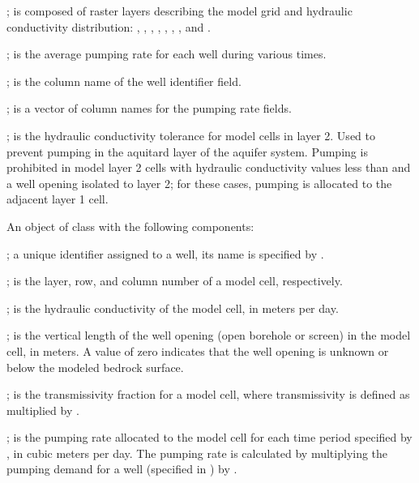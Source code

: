 \documentclass[letterpaper]{book}
\begin{document}
%
\begin{Arguments}
\begin{ldescription}
\item[\code{rs.model}] ; is composed of raster layers describing the model grid and hydraulic conductivity distribution:
, , , , , , , and .
\item[\code{wells}] ; is the average pumping rate for each well during various times.
\item[\code{well.col}] ; is the column name of the well identifier field.
\item[\code{rate.col}] ; is a vector of column names for the pumping rate fields.
\item[\code{lay2.hk.tol}] ; is the hydraulic conductivity tolerance for model cells in layer 2.
Used to prevent pumping in the aquitard layer of the aquifer system.
Pumping is prohibited in model layer 2 cells with hydraulic conductivity values less than  and a well opening isolated to layer 2;
for these cases, pumping is allocated to the adjacent layer 1 cell.
\end{ldescription}
\end{Arguments}
%
\begin{Value}
An object of  class with the following components:
\begin{ldescription}
\item[\code{...}] ; a unique identifier assigned to a well, its name is specified by .
\item[\code{lay, row, col}] ; is the layer, row, and column number of a model cell, respectively.
\item[\code{hk}] ; is the hydraulic conductivity of the model cell, in meters per day.
\item[\code{thk}] ; is the vertical length of the well opening (open borehole or screen) in the model cell, in meters.
A value of zero indicates that the well opening is unknown or below the modeled bedrock surface.
\item[\code{frac}] ; is the transmissivity fraction for a model cell, where transmissivity is defined as  multiplied by .
\item[\code{...}] ; is the pumping rate allocated to the model cell for each time period specified by , in cubic meters per day.
The pumping rate is calculated by multiplying the pumping demand for a well (specified in ) by .
\end{ldescription}
\end{Value}
\end{document}
